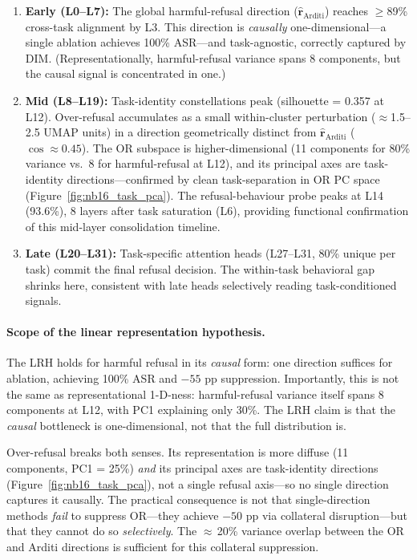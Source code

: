 \documentclass[11pt]{article}
\begin{document}
\begin{enumerate}
  \item \textbf{Early (L0--L7):} The global harmful-refusal direction ($\hat{\mathbf{r}}_{\text{Arditi}}$)
  reaches $\geq$89\% cross-task alignment by L3. This direction is \emph{causally}
  one-dimensional---a single ablation achieves 100\% ASR---and task-agnostic, correctly
  captured by DIM. (Representationally, harmful-refusal variance spans 8 components, but
  the causal signal is concentrated in one.)
  \item \textbf{Mid (L8--L19):} Task-identity constellations peak (silhouette = 0.357
  at L12). Over-refusal accumulates as a small within-cluster perturbation ($\approx$1.5--2.5 UMAP
  units) in a direction geometrically distinct from $\hat{\mathbf{r}}_{\text{Arditi}}$
  ($\cos \approx 0.45$). The OR subspace is higher-dimensional (11 components for 80\%
  variance vs.\ 8 for harmful-refusal at L12), and its principal axes are task-identity
  directions---confirmed by clean task-separation in OR PC space (Figure~\ref{fig:nb16_task_pca}).
  The refusal-behaviour probe peaks at L14 (93.6\%), 8 layers after task saturation (L6),
  providing functional confirmation of this mid-layer consolidation timeline.
  \item \textbf{Late (L20--L31):} Task-specific attention heads (L27--L31, 80\% unique
  per task) commit the final refusal decision. The within-task behavioral gap shrinks
  here, consistent with late heads selectively reading task-conditioned signals.
\end{enumerate}

\paragraph{Scope of the linear representation hypothesis.}
The LRH \citep{park2023linear} holds for harmful refusal in its \emph{causal} form:
one direction suffices for ablation, achieving 100\% ASR and $-55$ pp suppression.
Importantly, this is not the same as representational 1-D-ness: harmful-refusal
variance itself spans 8 components at L12, with PC1 explaining only 30\%.
The LRH claim is that the \emph{causal} bottleneck is one-dimensional, not that the
full distribution is.

Over-refusal breaks both senses. Its representation is more diffuse (11 components,
PC1 = 25\%) \emph{and} its principal axes are task-identity directions
(Figure~\ref{fig:nb16_task_pca}), not a single refusal axis---so no single direction
captures it causally. The practical consequence is not that single-direction methods
\emph{fail} to suppress OR---they achieve $-50$ pp via collateral disruption---but that
they cannot do so \emph{selectively}. The $\approx$\,20\% variance overlap between
the OR and Arditi directions is sufficient for this collateral suppression.
\end{document}
